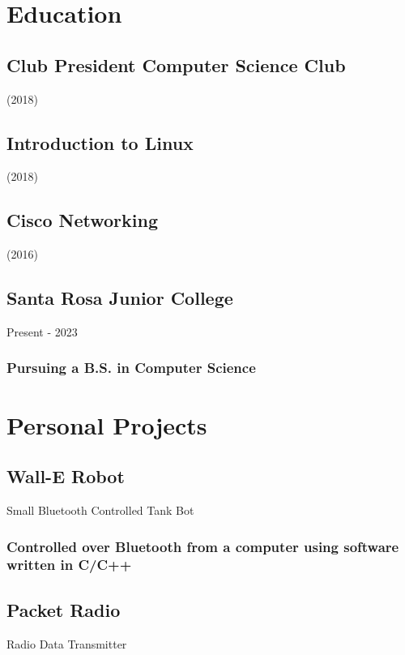 \documentclass{article}
\begin{document}
    		    		
	\section{Education}
        \subsection{Club President  Computer Science Club}  (2018)
        \vspace{-2mm}   
		 
		\subsection{Introduction to Linux}  (2018)
        \vspace{-2mm}   

		\subsection{Cisco Networking}  (2016)
        \vspace{-2mm}   
         
        \subsection{Santa Rosa Junior College} Present - 2023 
        \vspace{-2mm}
            \subsubsection{Pursuing a B.S. in Computer Science}
\section{Personal Projects}

	\subsection{Wall-E Robot}Small Bluetooth Controlled Tank Bot
    	\vspace{-3mm}
		\subsubsection{Controlled over Bluetooth from a computer using software written in C/C++}
	\subsection{Packet Radio} Radio Data Transmitter
    	\vspace{-3mm}
\end{document}

